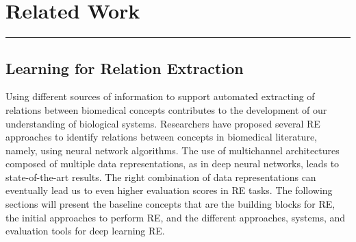 \hypertarget{2}{}

\chapter{Related Work}


\vspace{-1.6cm}

\begingroup
\color{gray}
\par\noindent\rule{\textwidth}{0.4pt}
\endgroup



\section{Learning for Relation Extraction}

Using different sources of information to support automated extracting of relations between biomedical concepts contributes to the development of our understanding of biological systems. Researchers have proposed several RE approaches to identify relations between concepts in biomedical literature, namely, using neural network algorithms. The use of multichannel architectures composed of multiple data representations, as in deep neural networks, leads to state-of-the-art results. The right combination of data representations can eventually lead us to even higher evaluation scores in RE tasks. The following sections will present the baseline concepts that are the building blocks for RE, the initial approaches to perform RE, and the different approaches, systems, and evaluation tools for deep learning RE.  


